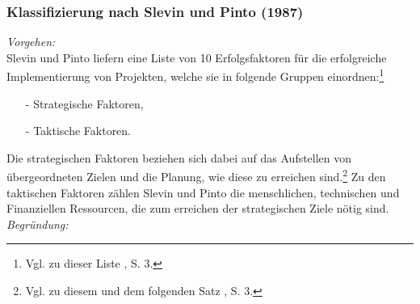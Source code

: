 \noindent
\subsubsection{Klassifizierung nach Slevin und Pinto (1987)}
\textit{Vorgehen:}\\\noindent
Slevin und Pinto liefern eine Liste von 10 Erfolgsfaktoren für die erfolgreiche Implementierung von Projekten, welche sie in folgende
Gruppen einordnen:\footnote{Vgl. zu dieser Liste \cite{Slevin.1987}, S. 3.}
\begin{itemize}\itemsep0pt
\item[-]Strategische Faktoren,
\item[-]Taktische Faktoren.
\end{itemize}
Die strategischen Faktoren beziehen sich dabei auf das Aufstellen von übergeordneten Zielen und die Planung, wie diese zu erreichen sind.\footnote{Vgl. zu diesem und dem folgenden Satz \cite{Slevin.1987}, S. 3.}
Zu den taktischen Faktoren zählen Slevin und Pinto die menschlichen, technischen und Finanziellen Ressourcen, die zum erreichen der
strategischen Ziele nötig sind.
\textit{Begründung:}\\\noindent
